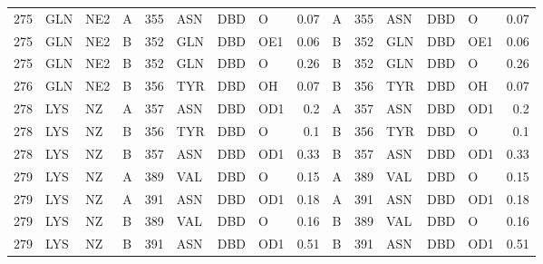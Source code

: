 \begin{longtable}{rlllrlllrlrlllr}
       275 & GLN        & NE2    & A         &         355 & ASN          & DBD         & O        &          0.07 & A         &         355 & ASN          & DBD         & O        &          0.07 \\
       275 & GLN        & NE2    & B         &         352 & GLN          & DBD         & OE1      &          0.06 & B         &         352 & GLN          & DBD         & OE1      &          0.06 \\
       275 & GLN        & NE2    & B         &         352 & GLN          & DBD         & O        &          0.26 & B         &         352 & GLN          & DBD         & O        &          0.26 \\
       276 & GLN        & NE2    & B         &         356 & TYR          & DBD         & OH       &          0.07 & B         &         356 & TYR          & DBD         & OH       &          0.07 \\
       278 & LYS        & NZ     & A         &         357 & ASN          & DBD         & OD1      &          0.2  & A         &         357 & ASN          & DBD         & OD1      &          0.2  \\
       278 & LYS        & NZ     & B         &         356 & TYR          & DBD         & O        &          0.1  & B         &         356 & TYR          & DBD         & O        &          0.1  \\
       278 & LYS        & NZ     & B         &         357 & ASN          & DBD         & OD1      &          0.33 & B         &         357 & ASN          & DBD         & OD1      &          0.33 \\
       279 & LYS        & NZ     & A         &         389 & VAL          & DBD         & O        &          0.15 & A         &         389 & VAL          & DBD         & O        &          0.15 \\
       279 & LYS        & NZ     & A         &         391 & ASN          & DBD         & OD1      &          0.18 & A         &         391 & ASN          & DBD         & OD1      &          0.18 \\
       279 & LYS        & NZ     & B         &         389 & VAL          & DBD         & O        &          0.16 & B         &         389 & VAL          & DBD         & O        &          0.16 \\
       279 & LYS        & NZ     & B         &         391 & ASN          & DBD         & OD1      &          0.51 & B         &         391 & ASN          & DBD         & OD1      &          0.51 \\

\end{longtable}
